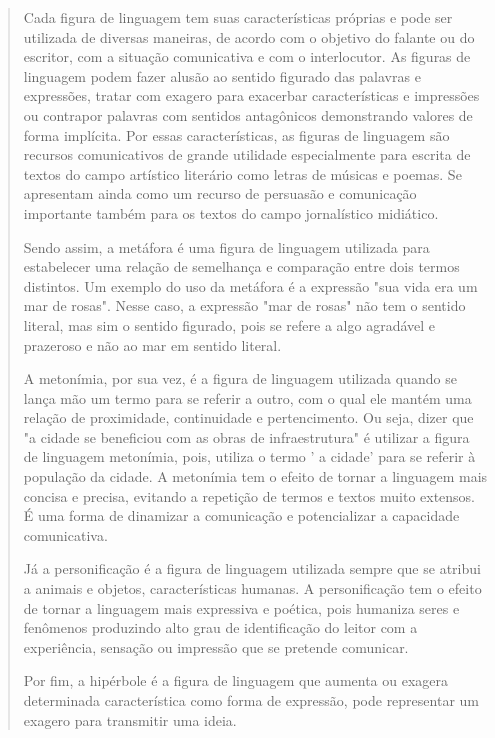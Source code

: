 {\begin{quote}
{Cada figura de linguagem tem suas características próprias e pode ser
utilizada de diversas maneiras, de acordo com o objetivo do falante ou
do escritor, com a situação comunicativa e com o interlocutor. As
figuras de linguagem podem fazer alusão ao sentido figurado das palavras
e expressões, tratar com exagero para exacerbar características e
impressões ou contrapor palavras com sentidos antagônicos demonstrando
valores de forma implícita. Por essas características, as figuras de
linguagem são recursos comunicativos de grande utilidade especialmente
para escrita de textos do campo artístico literário como letras de
músicas e poemas. Se apresentam ainda como um recurso de persuasão e
comunicação importante também para os textos do campo jornalístico
midiático.

Sendo assim, a metáfora é uma figura de linguagem utilizada para
estabelecer uma relação de semelhança e comparação entre dois termos
distintos. Um exemplo do uso da metáfora é a expressão "sua vida era um
mar de rosas". Nesse caso, a expressão "mar de rosas" não tem o sentido
literal, mas sim o sentido figurado, pois se refere a algo agradável e
prazeroso e não ao mar em sentido literal.

A metonímia, por sua vez, é a figura de linguagem utilizada quando se
lança mão um termo para se referir a outro, com o qual ele mantém uma
relação de proximidade, continuidade e pertencimento. Ou seja, dizer que
"a cidade se beneficiou com as obras de infraestrutura" é utilizar a
figura de linguagem metonímia, pois, utiliza o termo ' a cidade' para se
referir à população da cidade. A metonímia tem o efeito de tornar a
linguagem mais concisa e precisa, evitando a repetição de termos e
textos muito extensos. É uma forma de dinamizar a comunicação e
potencializar a capacidade comunicativa.

Já a personificação é a figura de linguagem utilizada sempre que se
atribui a animais e objetos, características humanas. A personificação
tem o efeito de tornar a linguagem mais expressiva e poética, pois
humaniza seres e fenômenos produzindo alto grau de identificação do
leitor com a experiência, sensação ou impressão que se pretende
comunicar.

Por fim, a hipérbole é a figura de linguagem que aumenta ou exagera
determinada característica como forma de expressão, pode representar um
exagero para transmitir uma ideia.


}
\end{quote}}
